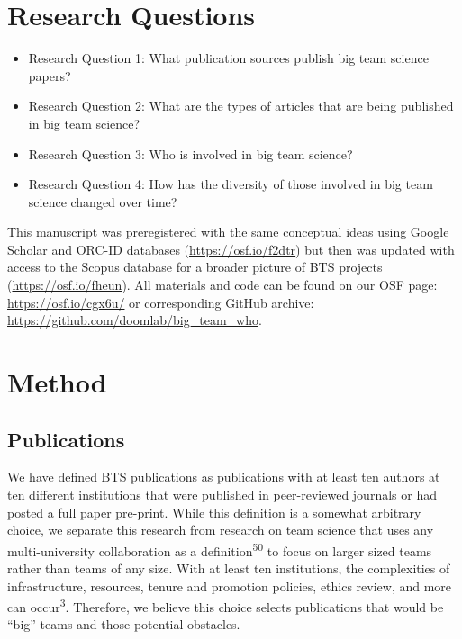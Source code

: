 \documentclass[
  man,floatsintext]{apa6}
\providecommand{\tightlist}{%
  \setlength{\itemsep}{0pt}\setlength{\parskip}{0pt}}
\begin{document}
\hypertarget{research-questions}{%
\section{Research Questions}\label{research-questions}}

\begin{itemize}
\tightlist
\item
  Research Question 1: What publication sources publish big team
  science papers?
\item
  Research Question 2: What are the types of articles that are being
  published in big team science?
\item
  Research Question 3: Who is involved in big team science?
\item
  Research Question 4: How has the diversity of those involved in big team science changed over time?
\end{itemize}

This manuscript was preregistered with the same conceptual ideas using
Google Scholar and ORC-ID databases (\url{https://osf.io/f2dtr}) but then
was updated with access to the Scopus database for a broader picture of
BTS projects (\url{https://osf.io/fheun}). All materials and code can be
found on our OSF page: \url{https://osf.io/cgx6u/} or corresponding GitHub
archive: \url{https://github.com/doomlab/big_team_who}.

\hypertarget{method}{%
\section{Method}\label{method}}

\hypertarget{publications}{%
\subsection{Publications}\label{publications}}

We have defined BTS publications as publications with at least ten
authors at ten different institutions that were published in
peer-reviewed journals or had posted a full paper pre-print. While this
definition is a somewhat arbitrary choice, we separate this research
from research on team science that uses any multi-university collaboration
as a definition\textsuperscript{50} to focus on larger sized teams rather
than teams of any size. With at least ten institutions, the complexities
of infrastructure, resources, tenure and promotion policies, ethics review, and more can occur\textsuperscript{3}. Therefore, we believe this choice selects publications that would be ``big'' teams and those potential obstacles.
\end{document}
